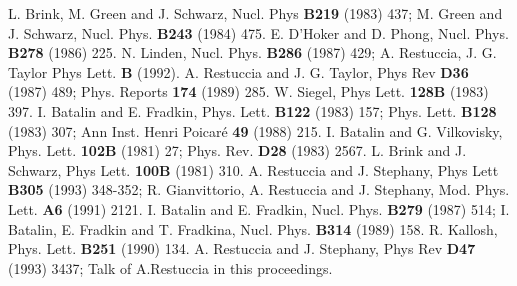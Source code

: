 \documentclass[a4paper,10pt]{article}
\begin{document}
\begin{thebibliography}{99}


\bibitem{[1]}L. Brink, M. Green and J. Schwarz, Nucl. Phys {\bf B219} (1983) 437;
M. Green and J. Schwarz, Nucl. Phys. {\bf B243} (1984) 475.
\bibitem{[2]}E. D'Hoker and D. Phong, Nucl. Phys. {\bf B278} (1986) 225.
\bibitem{[3]}N. Linden, Nucl. Phys. {\bf B286} (1987) 429;
A. Restuccia, J. G. Taylor Phys Lett. {\bf B} (1992).
\bibitem{[4]}A. Restuccia and J. G. Taylor, Phys Rev {\bf D36} (1987) 489; Phys.
Reports {\bf 174} (1989) 285.
\bibitem{[5]}W. Siegel, Phys Lett. {\bf 128B} (1983)
397.
\bibitem{[6]}I. Batalin and E. Fradkin, Phys. Lett. {\bf B122} (1983) 157;
Phys. Lett. {\bf B128} (1983) 307;
Ann Inst. Henri Poicar\'e {\bf 49} (1988) 215.
\bibitem{[7]}I. Batalin and G. Vilkovisky, Phys. Lett. {\bf 102B} (1981) 27;
Phys. Rev. {\bf D28} (1983) 2567.
\bibitem{[8]}L. Brink and J. Schwarz, Phys Lett. {\bf 100B} (1981) 310.
\bibitem{[9]}A. Restuccia and J. Stephany,  Phys Lett {\bf B305} (1993) 348-352;
R. Gianvittorio, A. Restuccia and J. Stephany, Mod. Phys. Lett. {\bf A6}  (1991) 2121.
\bibitem{[10]}I. Batalin and E. Fradkin, Nucl. Phys. {\bf B279} (1987) 514;
I. Batalin, E. Fradkin and T. Fradkina, Nucl. Phys. {\bf B314} (1989) 158.
\bibitem{[11]}R. Kallosh, Phys. Lett. {\bf B251} (1990) 134.
\bibitem{[12]}A. Restuccia and J. Stephany,   Phys Rev  {\bf D47} (1993) 3437;
Talk of A.Restuccia in this proceedings.
\end{thebibliography}
\end{document}
